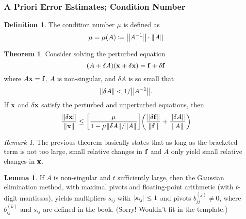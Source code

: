\documentclass[11pt,letterpaper]{article}
\numberwithin{figure}{section} %
\newcommand{\inv}[1]{#1^{-1}}
\newcommand{\keyword}[1]{\colorbox{cyan!20!}{#1}}
\theoremstyle{definition}
\newtheorem{theorem}{Theorem}[subsection]
\theoremstyle{definition}
\theoremstyle{definition}
\newtheorem{lemma}{Lemma}[subsection]
\theoremstyle{definition}
\newtheorem{definition}{Definition}[subsection]
\theoremstyle{definition}
\theoremstyle{remark}
\newtheorem*{remark}{Remark}
\theoremstyle{remark}
\theoremstyle{definition}
\theoremstyle{remark}
\theoremstyle{remark}
\begin{document}
\begin{multicols*}{3}
\subsubsection{A Priori Error Estimates; Condition Number}
\begin{definition}
	The \keyword{condition number} $\mu$ is defined as
	\[
		\mu = \mu(A) \coloneqq \norm{\inv{A}} \cdot \norm{A}
	\]
\end{definition}
\begin{theorem}
	Consider solving the perturbed equation
	\[
		(A + \delta A)(\vb{x} + \vb{\delta x}) = \vb{f} + \vb{\delta f}
	\]
	where $A\vb{x} = \vb{f}$, $A$ is non-singular, and $\delta A$ is so small
	that
	\[
		\norm{\delta A} < 1 / \norm{\inv{A}}.
	\]
	If $\vb{x}$ and $\vb{\delta x}$ satisfy the perturbed and unperturbed
	equations, then 
	\[
		\frac{\norm{\vb{\delta \vb{x}}}}{\norm{\vb{x}}} \leq \bqty{\frac{\mu}{1 - \mu
		\norm{\delta A}/\norm{A}}} \pqty{\frac{\norm{\vb{\delta f}}}{\norm{\vb{f}}}
		+ \frac{\norm{\delta A}}{\norm{A}}}
	\]
\end{theorem}
\begin{remark}
	The previous theorem basically states that as long as the bracketed term is
	not too large, small relative changes in $\vb{f}$ and $A$ only yield small
	relative changes in $\vb{x}$.
\end{remark}
\begin{lemma}
	If $A$ is non-singular and $t$ sufficiently large, then the Gaussian
	elimination method, with maximal pivots and floating-point arithmetic (with
	$t$-digit mantissas), yields multipliers $s_{ij}$ with $\abs{s_{ij}} \leq 1$
	and pivots $b_{jj}^{(j)} \neq 0$, where $b_{ij}^{(k)}$ and $s_{ij}$ are
	defined in the book. (Sorry! Wouldn't fit in the template.)
\end{lemma}

\end{multicols*}
\end{document}
